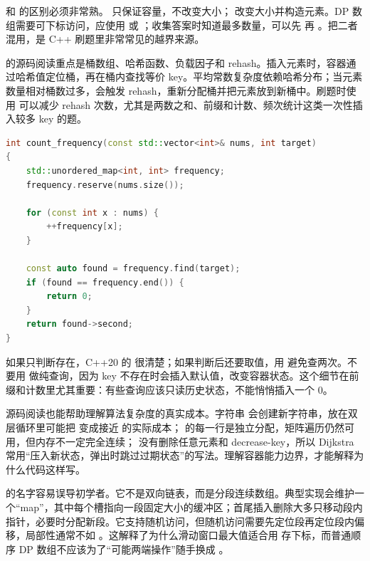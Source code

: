  和  的区别必须非常熟。  只保证容量，不改变大小； 改变大小并构造元素。DP 数组需要可下标访问，应使用  或 ；收集答案时知道最多数量，可以先  再 。把二者混用，是 C++ 刷题里非常常见的越界来源。

 的源码阅读重点是桶数组、哈希函数、负载因子和 rehash。插入元素时，容器通过哈希值定位桶，再在桶内查找等价 key。平均常数复杂度依赖哈希分布；当元素数量相对桶数过多，会触发 rehash，重新分配桶并把元素放到新桶中。刷题时使用  可以减少 rehash 次数，尤其是两数之和、前缀和计数、频次统计这类一次性插入较多 key 的题。

\begin{lstlisting}[language=C++,caption={unordered\_map 查询：contains 与 find 的取舍}]
int count_frequency(const std::vector<int>& nums, int target)
{
    std::unordered_map<int, int> frequency;
    frequency.reserve(nums.size());

    for (const int x : nums) {
        ++frequency[x];
    }

    const auto found = frequency.find(target);
    if (found == frequency.end()) {
        return 0;
    }
    return found->second;
}
\end{lstlisting}

如果只判断存在，C++20 的  很清楚；如果判断后还要取值，用  避免查两次。不要用  做纯查询，因为 key 不存在时会插入默认值，改变容器状态。这个细节在前缀和计数里尤其重要：有些查询应该只读历史状态，不能悄悄插入一个 0。

源码阅读也能帮助理解算法复杂度的真实成本。字符串  会创建新字符串，放在双层循环里可能把  变成接近  的实际成本； 的每一行是独立分配，矩阵遍历仍然可用，但内存不一定完全连续； 没有删除任意元素和 decrease-key，所以 Dijkstra 常用“压入新状态，弹出时跳过过期状态”的写法。理解容器能力边界，才能解释为什么代码这样写。

 的名字容易误导初学者。它不是双向链表，而是分段连续数组。典型实现会维护一个“map”，其中每个槽指向一段固定大小的缓冲区；首尾插入删除大多只移动段内指针，必要时分配新段。它支持随机访问，但随机访问需要先定位段再定位段内偏移，局部性通常不如 。这解释了为什么滑动窗口最大值适合用  存下标，而普通顺序 DP 数组不应该为了“可能两端操作”随手换成 。

